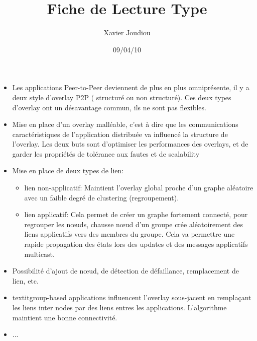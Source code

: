 \documentclass[11pt,a4paper]{article}
\title{Fiche de Lecture Type}
\author{Xavier Joudiou}
\date{09/04/10}
\begin{document}
	
  \begin{itemize}
  \renewcommand{\labelitemi}{$\Rightarrow$}
	\item Les applications Peer-to-Peer deviennent de plus en plus omniprésente, il y a deux style d'overlay P2P ( structuré ou non structuré). Ces deux types d'overlay ont un désavantage commun, ils ne sont pas flexibles.
	\item Mise en place d'un overlay malléable, c'est à dire que les communications caractéristiques de l'application distribuée va influencé la structure de l'overlay. Les deux buts sont d'optimiser les performances des overlays, et de garder les propriétés de tolérance aux fautes et de scalability
	\item Mise en place de deux types de lien:
	\begin{itemize}
  	\renewcommand{\labelitemi}{$\surd$}
		\item lien non-applicatif: Maintient l'overlay global proche d'un graphe aléatoire avec un faible degré de clustering (regroupement).
		\item lien applicatif: Cela permet de créer un graphe fortement connecté, pour regrouper les nœuds, chausse nœud d'un groupe crée aléatoirement des liens applicatifs vers des membres du groupe. Cela va permettre une rapide propagation des états lors des updates et des messages applicatifs multicast. 
	\end{itemize} 
	\item Possibilité d'ajout de nœud, de détection de défaillance, remplacement de lien, etc.
	\item textit{group}-based applications influencent l'overlay sous-jacent en remplaçant les liens inter nodes par des liens entres les applications. L'algorithme maintient une bonne connectivité.
	\item ...
  \end{itemize}
\end{document}
